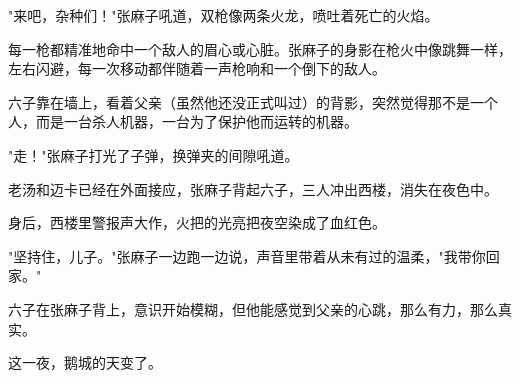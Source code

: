 "来吧，杂种们！"张麻子吼道，双枪像两条火龙，喷吐着死亡的火焰。

每一枪都精准地命中一个敌人的眉心或心脏。张麻子的身影在枪火中像跳舞一样，左右闪避，每一次移动都伴随着一声枪响和一个倒下的敌人。

六子靠在墙上，看着父亲（虽然他还没正式叫过）的背影，突然觉得那不是一个人，而是一台杀人机器，一台为了保护他而运转的机器。

"走！"张麻子打光了子弹，换弹夹的间隙吼道。

老汤和迈卡已经在外面接应，张麻子背起六子，三人冲出西楼，消失在夜色中。

身后，西楼里警报声大作，火把的光亮把夜空染成了血红色。

"坚持住，儿子。"张麻子一边跑一边说，声音里带着从未有过的温柔，"我带你回家。"

六子在张麻子背上，意识开始模糊，但他能感觉到父亲的心跳，那么有力，那么真实。

这一夜，鹅城的天变了。